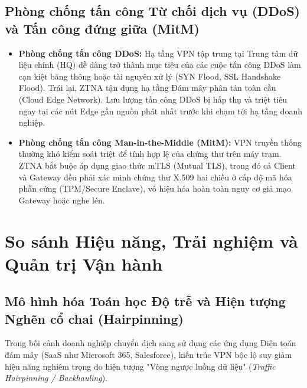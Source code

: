\subsection{Phòng chống tấn công Từ chối dịch vụ (DDoS) và Tấn công đứng giữa (MitM)}
\label{subsec:4_2_3}

\begin{itemize}
    \item \textbf{Phòng chống tấn công DDoS:} Hạ tầng VPN tập trung tại Trung tâm dữ liệu chính (HQ) dễ dàng trở thành mục tiêu của các cuộc tấn công DDoS làm cạn kiệt băng thông hoặc tài nguyên xử lý (SYN Flood, SSL Handshake Flood). Trái lại, ZTNA tận dụng hạ tầng Đám mây phân tán toàn cầu (Cloud Edge Network). Lưu lượng tấn công DDoS bị hấp thụ và triệt tiêu ngay tại các nút Edge gần nguồn phát nhất trước khi chạm tới hạ tầng doanh nghiệp.
    \item \textbf{Phòng chống tấn công Man-in-the-Middle (MitM):} VPN truyền thống thường khó kiểm soát triệt để tính hợp lệ của chứng thư trên máy trạm. ZTNA bắt buộc áp dụng giao thức mTLS (Mutual TLS), trong đó cả Client và Gateway đều phải xác minh chứng thư X.509 hai chiều ở cấp độ mã hóa phần cứng (TPM/Secure Enclave), vô hiệu hóa hoàn toàn nguy cơ giả mạo Gateway hoặc nghe lén.
\end{itemize}

\section{So sánh Hiệu năng, Trải nghiệm và Quản trị Vận hành}
\label{sec:4_3}

\subsection{Mô hình hóa Toán học Độ trễ và Hiện tượng Nghẽn cổ chai (Hairpinning)}
\label{subsec:4_3_1}

Trong bối cảnh doanh nghiệp chuyển dịch sang sử dụng các ứng dụng Điện toán đám mây (SaaS như Microsoft 365, Salesforce), kiến trúc VPN bộc lộ suy giảm hiệu năng nghiêm trọng do hiện tượng "Vòng ngược luồng dữ liệu" (\textit{Traffic Hairpinning / Backhauling}).

